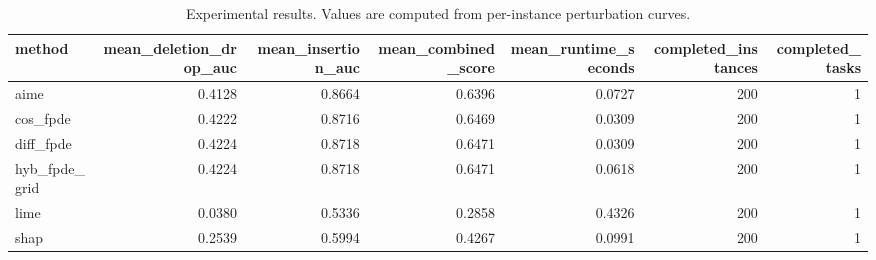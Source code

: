 \begin{table}[t]
\caption{Experimental results. Values are computed from per-instance perturbation curves.}
\label{tab:main_results_computed}
\centering
\begin{tabular}{lrrrrrr}
\toprule
method & mean\_deletion\_drop\_auc & mean\_insertion\_auc & mean\_combined\_score & mean\_runtime\_seconds & completed\_instances & completed\_tasks \\
\midrule
aime & 0.4128 & 0.8664 & 0.6396 & 0.0727 & 200 & 1 \\
cos\_fpde & 0.4222 & 0.8716 & 0.6469 & 0.0309 & 200 & 1 \\
diff\_fpde & 0.4224 & 0.8718 & 0.6471 & 0.0309 & 200 & 1 \\
hyb\_fpde\_grid & 0.4224 & 0.8718 & 0.6471 & 0.0618 & 200 & 1 \\
lime & 0.0380 & 0.5336 & 0.2858 & 0.4326 & 200 & 1 \\
shap & 0.2539 & 0.5994 & 0.4267 & 0.0991 & 200 & 1 \\
\bottomrule
\end{tabular}

\end{table}

